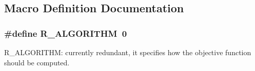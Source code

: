 \subsection{Macro Definition Documentation}
\hypertarget{application_8hh_aaeed326368abd712225f9ca34c338fbf}{
\subsubsection[{R\-\_\-\-A\-L\-G\-O\-R\-I\-T\-H\-M}]{\setlength{\rightskip}{0pt plus 5cm}\#define R\-\_\-\-A\-L\-G\-O\-R\-I\-T\-H\-M~0}}\label{application_8hh_aaeed326368abd712225f9ca34c338fbf}


R\-\_\-\-A\-L\-G\-O\-R\-I\-T\-H\-M\-: currently redundant, it specifies how the objective function should be computed. 

